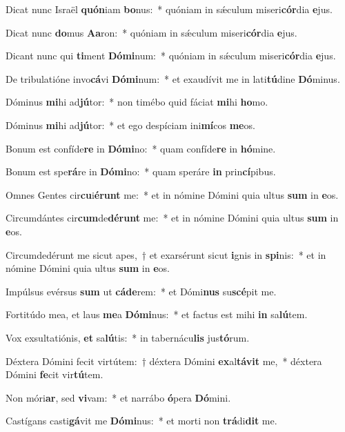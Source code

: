 \item Dicat nunc Israël \textbf{quón}iam \textbf{bo}nus:~* quóniam in sǽculum miseri\textbf{cór}dia \textbf{e}jus.
\item Dicat nunc \textbf{do}mus \textbf{A}\textbf{a}ron:~* quóniam in sǽculum miseri\textbf{cór}dia \textbf{e}jus.
\item Dicant nunc qui \textbf{ti}ment \textbf{Dó}\textbf{mi}num:~* quóniam in sǽculum miseri\textbf{cór}dia \textbf{e}jus.
\item De tribulatióne invo\textbf{cá}vi \textbf{Dó}\textbf{mi}num:~* et exaudívit me in lati\textbf{tú}dine \textbf{Dó}minus.
\item Dóminus \textbf{mi}hi ad\textbf{jú}tor:~* non timébo quid fáciat \textbf{mi}hi \textbf{ho}mo.
\item Dóminus \textbf{mi}hi ad\textbf{jú}tor:~* et ego despíciam ini\textbf{mí}cos \textbf{me}os.
\item Bonum est confíde\textbf{re} in \textbf{Dó}\textbf{mi}no:~* quam confíde\textbf{re} in \textbf{hó}mine.
\item Bonum est spe\textbf{rá}re in \textbf{Dó}\textbf{mi}no:~* quam speráre \textbf{in} prin\textbf{cí}pibus.
\item Omnes Gentes cir\textbf{cu}i\textbf{é}\textbf{runt} me:~* et in nómine Dómini quia ultus \textbf{sum} in \textbf{e}os.
\item Circumdántes cir\textbf{cum}de\textbf{dé}\textbf{runt} me:~* et in nómine Dómini quia ultus \textbf{sum} in \textbf{e}os.
\item Circumdedérunt me sicut apes,~† et exarsérunt sicut \textbf{i}gnis in \textbf{spi}nis:~* et in nómine Dómini quia ultus \textbf{sum} in \textbf{e}os.
\item Impúlsus evérsus \textbf{sum} ut \textbf{cá}\textbf{de}rem:~* et Dómi\textbf{nus} su\textbf{scé}pit me.
\item Fortitúdo mea, et laus \textbf{me}a \textbf{Dó}\textbf{mi}nus:~* et factus est mihi \textbf{in} sa\textbf{lú}tem.
\item Vox exsultatiónis, \textbf{et} sa\textbf{lú}tis:~* in tabernácu\textbf{lis} jus\textbf{tó}rum.
\item Déxtera Dómini fecit virtútem:~† déxtera Dómini \textbf{ex}al\textbf{tá}\textbf{vit} me,~* déxtera Dómini \textbf{fe}cit vir\textbf{tú}tem.
\item Non móri\textbf{ar}, sed \textbf{vi}vam:~* et narrábo \textbf{ó}pera \textbf{Dó}mini.
\item Castígans casti\textbf{gá}vit me \textbf{Dó}\textbf{mi}nus:~* et morti non \textbf{trá}di\textbf{dit} me.
